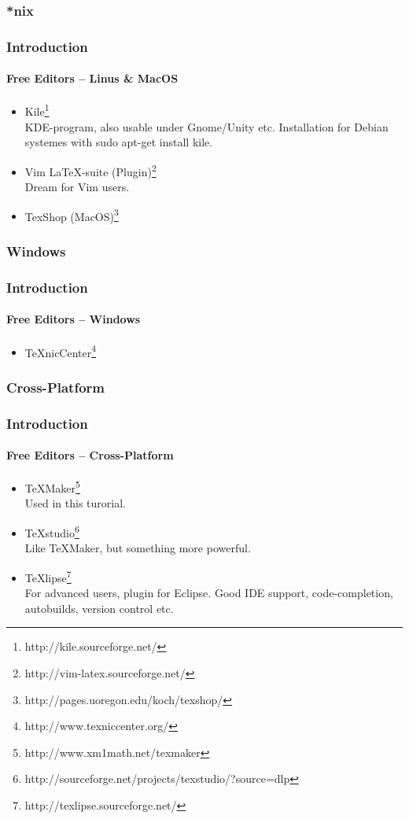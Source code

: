 \subsubsection{*nix}
\begin{frame}
\frametitle{Introduction}
\framesubtitle{Free Editors -- Linus \& MacOS }
\begin{itemize}
 \item Kile\footnote{http://kile.sourceforge.net/}\\KDE-program, also usable under Gnome\slash Unity etc.
 Installation for Debian systemes with {\ttfamily sudo apt-get
 install kile}.
  \item Vim \LaTeX -suite (Plugin)\footnote{http://vim-latex.sourceforge.net/}\\
  Dream for Vim users.
  \item TexShop (MacOS)\footnote{http://pages.uoregon.edu/koch/texshop/}
\end{itemize}
\end{frame}


\subsubsection{Windows}
\begin{frame}
\frametitle{Introduction}
\framesubtitle{Free Editors -- Windows}
\begin{itemize}
\item TeXnicCenter\footnote{http://www.texniccenter.org/}
\end{itemize}
\end{frame}


\subsubsection{Cross-Platform}
\begin{frame}
\frametitle{Introduction}
\framesubtitle{Free Editors -- Cross-Platform}
\begin{itemize}
  \item TeXMaker\footnote{http://www.xm1math.net/texmaker}\\
   Used in this turorial.
  \item TeXstudio\footnote{http://sourceforge.net/projects/texstudio/?source=dlp}\\
  Like TeXMaker, but something more powerful.
  \item TeXlipse\footnote{http://texlipse.sourceforge.net/}\\ For advanced users, plugin for
  Eclipse. Good IDE support, code-completion, autobuilds, version control etc.
\end{itemize}
\end{frame}

